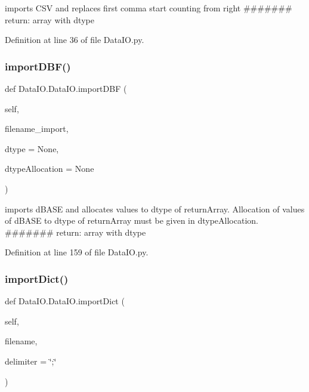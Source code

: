 \begin{DoxyVerb}imports CSV and replaces first comma start counting from right
#######
return:
    array with dtype
\end{DoxyVerb}
 

Definition at line 36 of file Data\+I\+O.\+py.

\mbox{\label{class_data_i_o_1_1_data_i_o_a6c56e9c0444c5bfd36093fcd966053b0}} 
\subsubsection{\texorpdfstring{import\+D\+B\+F()}{importDBF()}}
{\footnotesize\ttfamily def Data\+I\+O.\+Data\+I\+O.\+import\+D\+BF (\begin{DoxyParamCaption}\item[{}]{self,  }\item[{}]{filename\+\_\+import,  }\item[{}]{dtype = {\ttfamily None},  }\item[{}]{dtype\+Allocation = {\ttfamily None} }\end{DoxyParamCaption})}

\begin{DoxyVerb}imports dBASE and allocates values to dtype of returnArray. Allocation
of values of dBASE to dtype of returnArray must be given in 
dtypeAllocation.
#######
return:
   array with dtype
\end{DoxyVerb}
 

Definition at line 159 of file Data\+I\+O.\+py.

\mbox{\label{class_data_i_o_1_1_data_i_o_a57bc5372c9aa1d722c0d8e0cf1b749dd}} 
\subsubsection{\texorpdfstring{import\+Dict()}{importDict()}}
{\footnotesize\ttfamily def Data\+I\+O.\+Data\+I\+O.\+import\+Dict (\begin{DoxyParamCaption}\item[{}]{self,  }\item[{}]{filename,  }\item[{}]{delimiter = {\ttfamily \char`\"{};\char`\"{}} }\end{DoxyParamCaption})}



